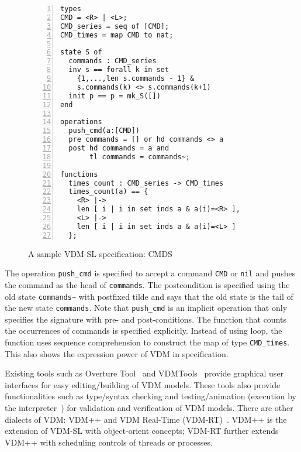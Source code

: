 \begin{figure}[t]
\begin{center}
\begin{mdframed}[roundcorner=5pt]
\begin{Verbatim}[fontsize=\small,numbers=left]
types
CMD = <R> | <L>;
CMD_series = seq of [CMD];
CMD_times = map CMD to nat;

state S of
  commands : CMD_series
  inv s == forall k in set 
    {1,...,len s.commands - 1} &
    s.commands(k) <> s.commands(k+1)
  init p == p = mk_S([])
end

operations
  push_cmd(a:[CMD])
  pre commands = [] or hd commands <> a
  post hd commands = a and
       tl commands = commands~;

functions
  times_count : CMD_series -> CMD_times
  times_count(a) == {
    <R> |->
    len [ i | i in set inds a & a(i)=<R> ],
    <L> |->
    len [ i | i in set inds a & a(i)=<L> ]
  };
\end{Verbatim}
\end{mdframed}
\vspace{-10pt}
\caption{A sample VDM-SL specification: CMDS}
\label{fig:module_sample}
\end{center}
\end{figure}

The operation {\tt push\_cmd} is specified to accept a command {\tt CMD} or {\tt nil} and pushes the command as the head of {\tt commands}. The postcondition is specified using the old state {\tt commands\textasciitilde} with postfixed tilde and says that the old state is the tail of the new state {\tt commands}. Note that {\tt push\_cmd} is an implicit operation that only specifies the signature with pre- and post-conditions. The function that counts the occurrences of commands is specified explicitly. Instead of using loop, the function uses sequence comprehension to construct the map of type {\tt CMD\_times}. This also shows the expression power of VDM in specification. 

Existing tools such as Overture Tool~\cite{Larsen:2010:OII:1668862.1668864} and VDMTools~\cite{2008:VAS:1361213.1361214} provide graphical user interfaces for easy editing/building of VDM models. These tools also provide functionalities such as type/syntax checking and testing/animation (execution by the interpreter~\cite{Prehn:1991:LNCS551}) for validation and verification of VDM models. There are other dialects of VDM: VDM++ and VDM Real-Time (VDM-RT)~\cite{10.1007/11813040_11}. VDM++ is the extension of VDM-SL with object-orient concepts; VDM-RT further extends VDM++ with scheduling controls of threads or processes.
